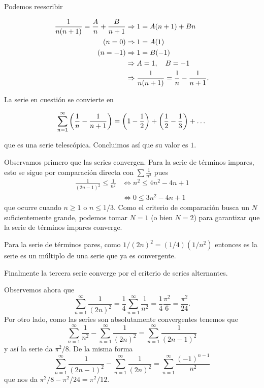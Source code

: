 \documentclass[12pt]{memoir}
\begin{document}
\begin{Ej}
Podemos reescribir

\begin{align*}
\frac{1}{n(n+1)}=\frac{A}{n}+\frac{B}{n+1}&\Rightarrow 1=A(n+1)+Bn\\
(n=0)&\Rightarrow 1=A(1)\\
(n=-1)&\Rightarrow 1=B(-1)\\
&\Rightarrow A=1,\quad B=-1\\
&\Rightarrow \frac{1}{n(n+1)}=\frac{1}{n}-\frac{1}{n+1}.
\end{align*}
 
La serie en cuestión se convierte en 

\[
\sum_{n=1}^{\infty}\left(\frac{1}{n}-\frac{1}{n+1}\right)=\left(1-\half\right)+\left(\half-\frac13\right)+\dots
\]

que es una serie telescópica. Concluimos así que su valor es \(1\).
\end{Ej}

\begin{Ej}
    Observamos primero que las series convergen. Para la serie de términos impares, esto se sigue por comparación directa con \(\sum \frac{1}{n^2}\) pues 
    \begin{align*}
    \frac{1}{(2n-1)^2}\leq\frac{1}{n^2}&\iff n^2\leq 4n^2-4n+1\\
    &\iff 0\leq 3n^2-4n+1
    \end{align*}    
    que ocurre cuando \(n\geq 1\) o \(n\leq 1/3\). Como el criterio de comparación busca un \(N\) suficientemente grande, podemos tomar \(N=1\) (o bien \(N=2\)) para garantizar que la serie de términos impares converge.\par
    Para la serie de términos pares, como \(1/(2n)^2=(1/4)(1/n^2)\) entonces es la serie es un múltiplo de una serie que ya es convergente.\par
    Finalmente la tercera serie converge por el criterio de series alternantes.\par
    Observemos ahora que 
    \[
    \sum_{n=1}^{\infty}\frac{1}{(2n)^2}=\frac{1}{4}\sum_{n=1}^{\infty}\frac{1}{n^2}=\frac{1}{4}\frac{\pi^2}{6}=\frac{\pi^2}{24}.
    \]
    Por otro lado, como las series son absolutamente convergentes tenemos que 
    \[
    \sum_{n=1}^{\infty}\frac{1}{n^2}-\sum_{n=1}^{\infty}\frac{1}{(2n)^2}=\sum_{n=1}^{\infty}\frac{1}{(2n-1)^2}
    \]
    y así la serie da \(\pi^2/8\). De la misma forma 
    \[
    \sum_{n=1}^{\infty}\frac{1}{(2n-1)^2}-\sum_{n=1}^{\infty}\frac{1}{(2n)^2}=\sum_{n=1}^{\infty}\frac{(-1)^{n-1}}{n^2}
    \]
    que nos da \(\pi^2/8-\pi^2/24=\pi^2/12\).
\end{Ej}
\end{document}
